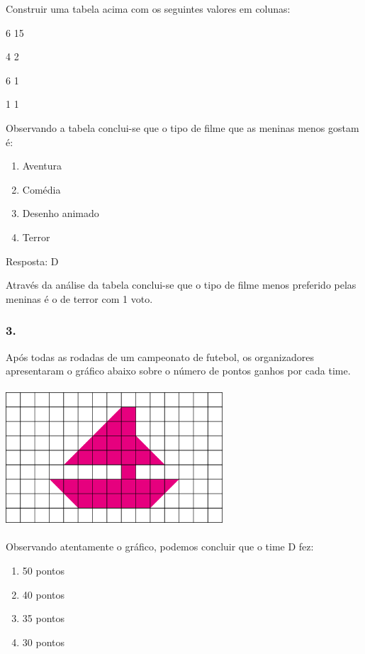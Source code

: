 Construir uma tabela acima com os seguintes valores em colunas:

6 15

4 2

6 1

1 1

Observando a tabela conclui-se que o tipo de filme que as meninas menos
gostam é:

\begin{enumerate}
\def\labelenumi{\alph{enumi})}
\item
  Aventura
\item
  Comédia
\item
  Desenho animado
\item
  Terror
\end{enumerate}

Resposta: D

Através da análise da tabela conclui-se que o tipo de filme menos
preferido pelas meninas é o de terror com 1 voto.

\subsubsection{3.}\label{section-110}

Após todas as rodadas de um campeonato de futebol, os organizadores
apresentaram o gráfico abaixo sobre o número de pontos ganhos por cada
time.

\includegraphics[width=3.19194in,height=2.04184in]{media/image94.png}

Observando atentamente o gráfico, podemos concluir que o time D fez:

\begin{enumerate}
\def\labelenumi{\alph{enumi})}
\item
  50 pontos
\item
  40 pontos
\item
  35 pontos
\item
  30 pontos
\end{enumerate}

